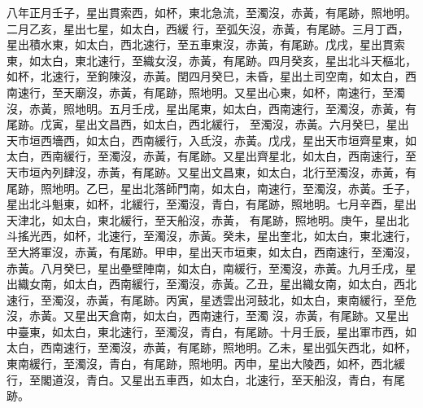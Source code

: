 \begin{pinyinscope}
 八年正月壬子，星出貫索西，如杯，東北急流，至濁沒，赤黃，有尾跡，照地明。二月乙亥，星出七星，如太白，西緩
 行，至弧矢沒，赤黃，有尾跡。三月丁酉，星出積水東，如太白，西北速行，至五車東沒，赤黃，有尾跡。戊戌，星出貫索東，如太白，東北速行，至織女沒，赤黃，有尾跡。四月癸亥，星出北斗天樞北，如杯，北速行，至鉤陳沒，赤黃。閏四月癸巳，未昏，星出土司空南，如太白，西南速行，至天廟沒，赤黃，有尾跡，照地明。又星出心東，如杯，南速行，至濁沒，赤黃，照地明。五月壬戌，星出尾東，如太白，西南速行，至濁沒，赤黃，有尾跡。戊寅，星出文昌西，如太白，西北緩行，
 至濁沒，赤黃。六月癸巳，星出天市垣西墻西，如太白，西南緩行，入氐沒，赤黃。戊戌，星出天市垣齊星東，如太白，西南緩行，至濁沒，赤黃，有尾跡。又星出齊星北，如太白，西南速行，至天市垣內列肆沒，赤黃，有尾跡。又星出文昌東，如太白，北行至濁沒，赤黃，有尾跡，照地明。乙巳，星出北落師門南，如太白，南速行，至濁沒，赤黃。壬子，星出北斗魁東，如杯，北緩行，至濁沒，青白，有尾跡，照地明。七月辛酉，星出天津北，如太白，東北緩行，至天船沒，赤黃，
 有尾跡，照地明。庚午，星出北斗搖光西，如杯，北速行，至濁沒，赤黃。癸未，星出奎北，如太白，東北速行，至大將軍沒，赤黃，有尾跡。甲申，星出天市垣東，如太白，西南速行，至濁沒，赤黃。八月癸巳，星出壘壁陣南，如太白，南緩行，至濁沒，赤黃。九月壬戌，星出織女南，如太白，西南緩行，至濁沒，赤黃。乙丑，星出織女南，如太白，西北速行，至濁沒，赤黃，有尾跡。丙寅，星透雲出河鼓北，如太白，東南緩行，至危沒，赤黃。又星出天倉南，如太白，西南速行，至濁
 沒，赤黃，有尾跡。又星出中臺東，如太白，東北速行，至濁沒，青白，有尾跡。十月壬辰，星出軍市西，如太白，西南速行，至濁沒，赤黃，有尾跡，照地明。乙未，星出弧矢西北，如杯，東南緩行，至濁沒，青白，有尾跡，照地明。丙申，星出大陵西，如杯，西北緩行，至閣道沒，青白。又星出五車西，如太白，北速行，至天船沒，青白，有尾跡。




\end{pinyinscope}
